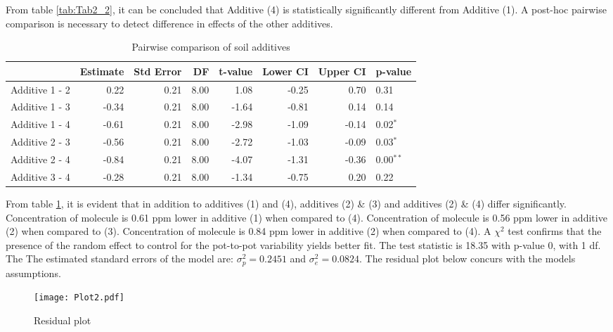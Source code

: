 \documentclass[11pt,a4paper]{article}
\begin{document}
From table \ref{tab:Tab2_2}, it can be concluded that Additive (4) is statistically significantly different from Additive (1). A post-hoc pairwise comparison is necessary to detect difference in effects of the other additives. 
\begin{table}[ht]
\centering
\begin{tabular}{rrrrrrrl}
  \hline
 & Estimate & Std Error & DF & t-value & Lower CI & Upper CI & p-value \\ 
  \hline
  Additive 1 - 2 & 0.22 & 0.21 & 8.00 & 1.08 & -0.25 & 0.70 & 0.31 \\ 
  Additive 1 - 3 & -0.34 & 0.21 & 8.00 & -1.64 & -0.81 & 0.14 & 0.14 \\ 
  Additive 1 - 4 & -0.61 & 0.21 & 8.00 & -2.98 & -1.09 & -0.14 & 0.02$^{*}$ \\ 
  Additive 2 - 3 & -0.56 & 0.21 & 8.00 & -2.72 & -1.03 & -0.09 & 0.03$^{*}$ \\ 
  Additive 2 - 4 & -0.84 & 0.21 & 8.00 & -4.07 & -1.31 & -0.36 & 0.00$^{**}$ \\ 
  Additive 3 - 4 & -0.28 & 0.21 & 8.00 & -1.34 & -0.75 & 0.20 & 0.22 \\ 
   \hline
\end{tabular}
\caption{Pairwise comparison of soil additives}
\label{tab:Tab2_3}
\end{table}
From table \ref{tab:Tab2_3}, it is evident that in addition to additives (1) and (4), additives (2) \& (3) and additives (2) \& (4) differ significantly. Concentration of molecule is 0.61 ppm lower in additive (1) when compared to (4). Concentration of molecule is 0.56 ppm lower in additive (2) when compared to (3). Concentration of molecule is 0.84 ppm lower in additive (2) when compared to (4). A $\chi^2$ test confirms that the presence of the random effect to control for the pot-to-pot variability yields better fit. The test statistic is 18.35 with p-value 0, with 1 df. The The estimated standard errors of the model are: $\sigma_p^2 = 0.2451$ and $\sigma_e^2 = 0.0824$. The residual plot below concurs with the models assumptions.

\begin{figure}[H]
\begin{center}
\texttt{[image: Plot2.pdf]}
\end{center}
\caption{Residual plot}
\label{fig:Fig2_2}
\end{figure}
\end{document}
